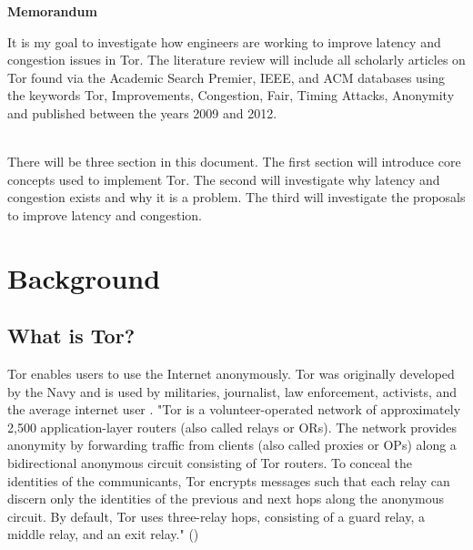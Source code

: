 \documentclass[letterpaper,13pt]{texMemo}
\begin{document}
\singlespace
\begin{center}
\large {\bf Memorandum}
\end{center}
\setlength{\topmargin}{0in}
\maketitle
\noindent
It is my goal to investigate how engineers are working to improve latency and congestion issues in
Tor. The literature review will include all scholarly articles on Tor found via the Academic Search
Premier, IEEE, and ACM databases using the keywords Tor, Improvements, Congestion, Fair, Timing
Attacks, Anonymity and published between the years 2009 and 2012.

\noindent
\\There will be three section in this document. The first section will introduce core concepts used to
implement Tor. The second will investigate why latency and congestion exists and why it is a
problem. The third will investigate the proposals to improve latency and congestion.

\section*{Background}

    \subsection*{What is Tor?}
    Tor enables users to use the Internet anonymously. Tor was originally developed by the Navy
    and is used by militaries, journalist, law enforcement, activists, and the average internet user
    \citep[2]{Tor:web}. 
    "Tor is a volunteer-operated network of approximately 2,500 application-layer routers (also
    called relays or ORs). The network provides anonymity by forwarding traffic from clients (also
    called proxies or OPs) along a bidirectional anonymous circuit consisting of Tor routers. To
    conceal the identities of the communicants, Tor encrypts messages such that each relay can
    discern only the identities of the previous and next hops along the anonymous circuit.  By
    default, Tor uses three-relay hops, consisting of a guard relay, a middle relay, and an exit
    relay." (\citeauthor[1]{Moore})
\end{document}
